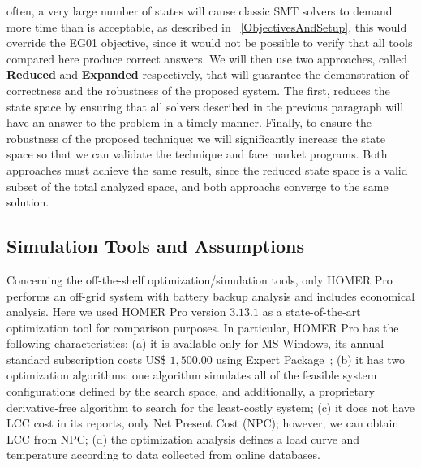 \documentclass[10pt,journal,compsoc]{IEEEtran}
\begin{document}
often, a very large number of states will cause classic SMT solvers to demand more time than is acceptable, as described in ~\ref{ObjectivesAndSetup}, this would override the EG01 objective, since it would not be possible to verify that all tools compared here produce correct answers. We will then use two approaches, called \textbf{Reduced} and \textbf{Expanded} respectively, that will guarantee the demonstration of correctness and the robustness of the proposed system. The first, reduces the state space by ensuring that all solvers described in the previous paragraph will have an answer to the problem in a timely manner. Finally, to ensure the robustness of the proposed technique: we will significantly increase the state space so that we can validate the technique and face market programs. Both approaches must achieve the same result, since the reduced state space is a valid subset of the total analyzed space, and both approachs converge to the same solution.\color{black}


\subsection{Simulation Tools and Assumptions}
\label{sec:SimulationToolsandAssumptions}
Concerning the off-the-shelf optimization/simulation tools, only HOMER Pro performs an off-grid system with battery backup analysis and includes economical analysis. Here we used HOMER Pro version $3.13.1$ as a state-of-the-art optimization tool for comparison purposes. In particular, HOMER Pro has the following characteristics:
\color{blue}(a) it is available only for MS-Windows, its annual standard subscription costs US\$ $1,500.00$ using Expert Package~\cite{HOMER}; \color{black}
(b) it has two optimization algorithms: one algorithm simulates all of the feasible system configurations defined by the search space, and additionally, a proprietary derivative-free algorithm to search for the least-costly system;
(c) it does not have LCC cost in its reports, only Net Present Cost (NPC); however, we can obtain LCC from NPC; 
(d) the optimization analysis defines a load curve and temperature according to data collected from online databases. 
\end{document}
